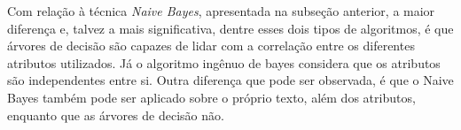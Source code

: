 \documentclass[oneside,openright,12pt]{ufsm_2015} %
\begin{document}
    \par Com relação à técnica \textit{Naive Bayes}, apresentada na subseção anterior, a maior diferença e, talvez a mais significativa, dentre esses dois tipos de algoritmos, é que árvores de decisão são capazes de lidar com a correlação entre os diferentes atributos utilizados. Já o algoritmo ingênuo de bayes considera que os atributos são independentes entre si. Outra diferença que pode ser observada, é que o Naive Bayes também pode ser aplicado sobre o próprio texto, além dos atributos, enquanto que as árvores de decisão não.

\end{document}
